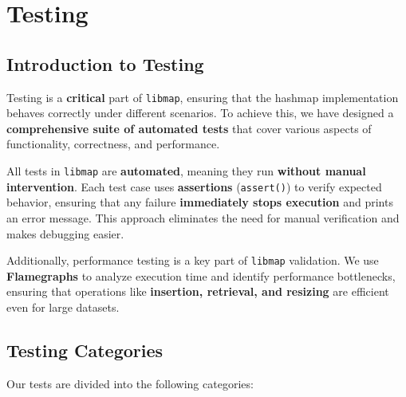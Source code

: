 \documentclass[titlepage]{article}
\begin{document}
\newpage

\newpage
\section{Testing}

\subsection{Introduction to Testing}

Testing is a \textbf{critical} part of \texttt{libmap}, ensuring that the hashmap implementation behaves correctly under different scenarios. To achieve this, we have designed a \textbf{comprehensive suite of automated tests} that cover various aspects of functionality, correctness, and performance.

All tests in \texttt{libmap} are \textbf{automated}, meaning they run \textbf{without manual intervention}. Each test case uses \textbf{assertions} (\texttt{assert()}) to verify expected behavior, ensuring that any failure \textbf{immediately stops execution} and prints an error message. This approach eliminates the need for manual verification and makes debugging easier.

Additionally, performance testing is a key part of \texttt{libmap} validation. We use \textbf{Flamegraphs} to analyze execution time and identify performance bottlenecks, ensuring that operations like \textbf{insertion, retrieval, and resizing} are efficient even for large datasets.

\subsection{Testing Categories}

Our tests are divided into the following categories:
\end{document}
